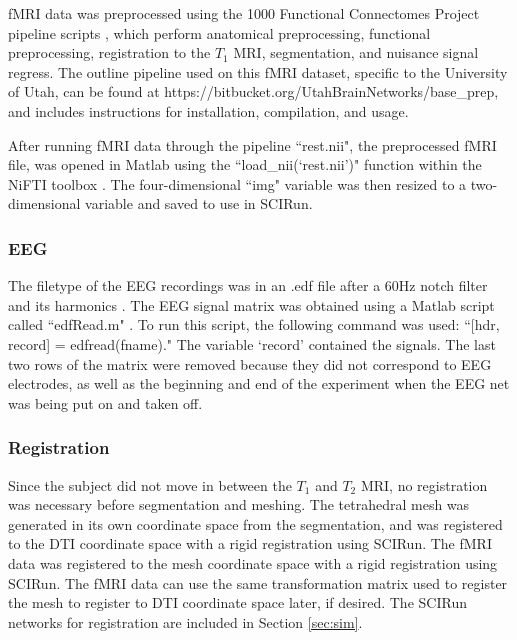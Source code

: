 fMRI data was preprocessed using the 1000 Functional Connectomes Project pipeline scripts \cite{ref:fcon}, which perform anatomical preprocessing, functional preprocessing, registration to the $T_1$ MRI, segmentation, and nuisance signal regress. The outline pipeline used on this fMRI dataset, specific to the University of Utah, can be found at https://bitbucket.org/UtahBrainNetworks/base\_prep, and includes instructions for installation, compilation, and usage.  

After running fMRI data through the pipeline ``rest.nii", the preprocessed fMRI file, was opened in Matlab using the ``load\_nii(`rest.nii')" function within the NiFTI toolbox \cite{ref:nifti}. The four-dimensional ``img" variable was then resized to a two-dimensional variable and saved to use in SCIRun. 

\subsubsection{EEG}

The filetype of the EEG recordings was in an .edf file after a 60Hz notch filter and its harmonics \cite{ref:filter}. The EEG signal matrix was obtained using a Matlab script called ``edfRead.m" \cite{ref:edfread}. To run this script, the following command was used: ``[hdr, record] = edfread(fname)." The variable `record' contained the signals. The last two rows of the matrix were removed because they did not correspond to EEG electrodes, as well as the beginning and end of the experiment when the EEG net was being put on and taken off. 

\subsubsection{Registration}

Since the subject did not move in between the $T_1$ and $T_2$ MRI, no registration was necessary before segmentation and meshing. The tetrahedral mesh was generated in its own coordinate space from the segmentation, and was registered to the DTI coordinate space with a rigid registration using SCIRun. The fMRI data was registered to the mesh coordinate space with a rigid registration using SCIRun. The fMRI data can use the same transformation matrix used to register the mesh to register to DTI coordinate space later, if desired. The SCIRun networks for registration are included in Section \ref{sec:sim}.

